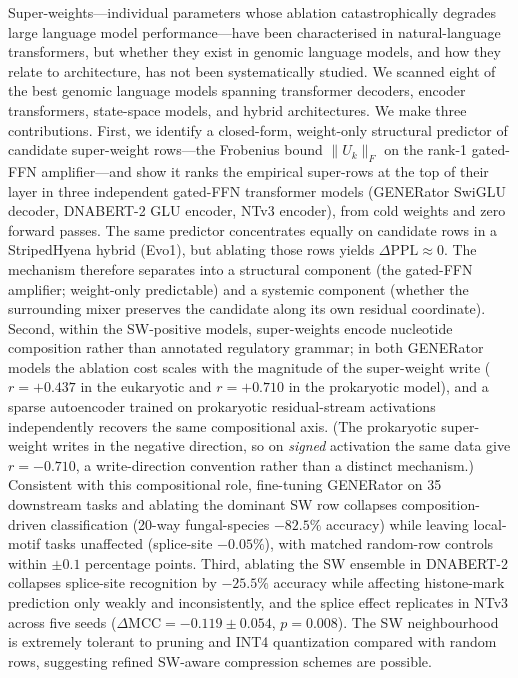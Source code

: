 \documentclass[11pt]{article}
\begin{document}
Super-weights---individual parameters whose ablation catastrophically
degrades large language model performance---have been characterised
in natural-language transformers, but whether they exist in genomic
language models, and how they relate to architecture, has not been
systematically studied. We scanned eight of the best genomic
language models spanning transformer decoders, encoder transformers,
state-space models, and hybrid architectures. We make three
contributions. First, we identify a closed-form, weight-only
structural predictor of candidate super-weight rows---the Frobenius
bound $\|U_k\|_F$ on the rank-1 gated-FFN amplifier---and show it
ranks the empirical super-rows at the top of their layer in three
independent gated-FFN transformer models (GENERator SwiGLU decoder,
DNABERT-2 GLU encoder, NTv3 encoder), from cold weights and zero
forward passes. The same predictor concentrates equally on candidate
rows in a StripedHyena hybrid (Evo1), but ablating those rows yields
$\Delta\mathrm{PPL} \approx 0$. The mechanism therefore separates
into a structural component (the gated-FFN amplifier; weight-only
predictable) and a systemic component (whether the surrounding mixer
preserves the candidate along its own residual coordinate). Second,
within the SW-positive models, super-weights encode nucleotide
composition rather than annotated regulatory grammar; in both
GENERator models the ablation cost scales with the magnitude of the
super-weight write ($r = {+}0.437$ in the eukaryotic and
$r = {+}0.710$ in the prokaryotic model), and a sparse autoencoder
trained on prokaryotic residual-stream activations independently
recovers the same compositional axis. (The prokaryotic super-weight
writes in the negative direction, so on \emph{signed} activation the
same data give $r = {-}0.710$, a write-direction convention rather
than a distinct mechanism.) Consistent with this compositional role,
fine-tuning GENERator on 35 downstream tasks and ablating the
dominant SW row collapses composition-driven classification
(20-way fungal-species $-82.5\%$ accuracy) while leaving
local-motif tasks unaffected
(splice-site $-0.05\%$), with matched random-row controls within
$\pm 0.1$ percentage points. Third, ablating the SW ensemble in
DNABERT-2 collapses splice-site recognition by $-25.5\%$ accuracy
while affecting histone-mark prediction only weakly and
inconsistently, and the splice effect replicates in
NTv3 across five seeds ($\Delta\mathrm{MCC} = -0.119 \pm 0.054$,
$p = 0.008$). The SW neighbourhood is extremely tolerant to pruning
and INT4 quantization compared with random rows, suggesting refined
SW-aware compression schemes are possible.
\end{document}
